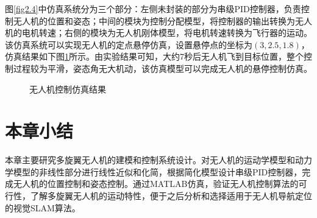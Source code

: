 图\ref{fig2.4}中仿真系统分为三个部分：左侧未封装的部分为串级PID控制器，负责控制无人机的位置和姿态；中间的模块为控制分配模型，将控制器的输出转换为无人机的电机转速；右侧的模块为无人机刚体模型，将电机转速转换为飞行器的运动。该仿真系统可以实现无人机的定点悬停仿真，设置悬停点的坐标为$(3,2.5,1.8)$，仿真结果如下图\ref{fig2.5}所示。由实验结果可知，大约7秒后无人机飞到目标位置，整个控制过程较为平滑，姿态角无大机动，该仿真模型可以完成无人机的悬停控制仿真。

\begin{figure}[H]
\centering
\caption{无人机控制仿真结果}
\label{fig2.5}
\end{figure}


\section{本章小结}
本章主要研究多旋翼无人机的建模和控制系统设计。对无人机的运动学模型和动力学模型的非线性部分进行线性近似和化简，根据简化模型设计串级PID控制器，完成无人机的位置控制和姿态控制。通过MATLAB仿真，验证无人机控制算法的可行性，了解多旋翼无人机的运动特性，便于之后分析和选择适用于无人机导航定位的视觉SLAM算法。

